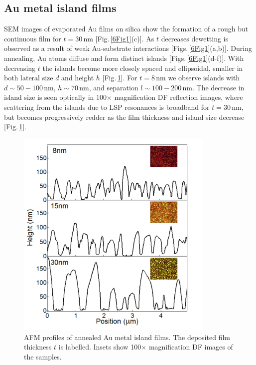 \subsection{Au metal island films}

SEM images of evaporated Au films on silica show the formation of a rough but continuous film for $t=30$\,nm [Fig.\,\ref{6Fig1}(c)]. As $t$ decreases dewetting is observed as a result of weak Au-substrate interactions [Figs.\,\ref{6Fig1}(a,b)]. During annealing, Au atoms diffuse and form distinct islands [Figs.\,\ref{6Fig1}(d-f)]. With decreasing $t$ the islands become more closely spaced and ellipsoidal, smaller in both lateral size $d$ and height $h$ [Fig.\,\ref{6Fig2}]. For $t=8$\,nm we observe islands with $d \sim 50-100$\,nm, $h\sim70$\,nm, and separation $l \sim 100-200$\,nm. The decrease in island size is seen optically in 100$\times$ magnification DF reflection images, where scattering from the islands due to LSP resonances is broadband for $t=30$\,nm, but becomes progressively redder as the film thickness and island size decrease [Fig.\,\ref{6Fig2}]. 
\begin{figure}[h!] 
\centering    
\includegraphics[width=0.85\textwidth]{Fig2}
\caption{AFM profiles of annealed Au metal island films. The deposited film thickness $t$ is labelled. Insets show 100$\times$ magnification DF images of the samples.}
\label{6Fig2}
\end{figure}

